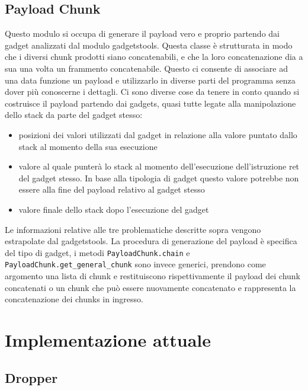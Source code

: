 \subsection{Payload Chunk}

Questo modulo si occupa di generare il payload vero e proprio partendo
dai gadget analizzati dal modulo gadgetstools. Questa classe è
strutturata in modo che i diversi chunk prodotti siano concatenabili,
e che la loro concatenazione dia a sua una volta un frammento
concatenabile. Questo ci consente di associare ad una data funzione un
payload e utilizzarlo in diverse parti del programma senza dover più
conoscerne i dettagli. Ci sono diverse cose da tenere in conto quando
si costruisce il payload partendo dai gadgets, quasi tutte legate alla
manipolazione dello stack da parte del gadget stesso:

\begin{itemize}

  \item posizioni dei valori utilizzati dal gadget in relazione alla
    valore puntato dallo stack al momento della sua esecuzione

  \item valore al quale punterà lo stack al momento dell'esecuzione
    dell'istruzione ret del gadget stesso. In base alla tipologia di
    gadget questo valore potrebbe non essere alla fine del payload
    relativo al gadget stesso
    
  \item valore finale dello stack dopo l'esecuzione del gadget

\end{itemize}

Le informazioni relative alle tre problematiche descritte sopra
vengono estrapolate dal gadgetstools. La procedura di generazione del
payload è specifica del tipo di gadget, i metodi
\lstinline{PayloadChunk.chain} e
\lstinline{PayloadChunk.get_general_chunk} sono invece generici,
prendono come argomento una lista di chunk e restituiscono
rispettivamente il payload dei chunk concatenati o un chunk che può
essere nuovamente concatenato e rappresenta la concatenazione dei
chunks in ingresso.


\section{Implementazione attuale}

\subsection{Dropper}

